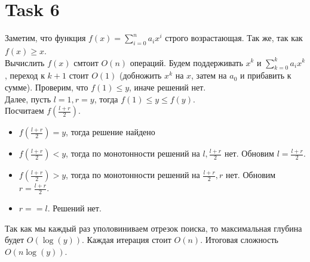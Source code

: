\documentclass[12pt]{exam}
\begin{document}
\section*{Task 6}
Заметим, что функция $f(x) = \sum_{i=0}^n a_i x^i$ строго возрастающая. 
Так же, так как $f(x) \geq x$. \\
Вычислить $f(x)$ смтоит $O(n)$ операций. 
Будем поддерживать $x^k$ и $\sum_{k=0}^k a_i x^k$, переход к $k+1$ стоит $O(1)$ 
(добножить $x^k$ на $x$, затем на $a_0$ и прибавить к сумме).
Проверим, что $f(1) \leq y$, иначе решений нет. \\
Далее, пусть $l = 1, r = y$, тогда $f(1) \leq y \leq f(y)$.\\
Посчитаем $f\left( \frac{l + r}{2} \right)$. \\
\begin{itemize}
    \item $f\left( \frac{l + r}{2} \right) = y$, тогда решение найдено
    \item $f\left( \frac{l + r}{2} \right) < y$, тогда по монотонности решений на $l, \frac{l + r}{2}$ нет. 
    Обновим $l = \frac{l + r}{2}$.
    \item $f\left( \frac{l + r}{2} \right) > y$, тогда по монотонности решений на $\frac{l + r}{2}, r$ нет. 
    Обновим $r = \frac{l + r}{2}$.
    \item $r == l$. Решений нет.
\end{itemize}
Так как мы каждый раз уполовиниваем отрезок поиска, то максимальная глубина будет $O(\log(y))$. 
Каждая итерация стоит $O(n)$. Итоговая сложность $O(n \log(y))$.
\end{document}
